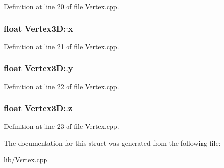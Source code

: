 Definition at line 20 of file Vertex.\+cpp.

\subsubsection[{\texorpdfstring{x}{x}}]{\setlength{\rightskip}{0pt plus 5cm}float Vertex3\+D\+::x}\hypertarget{struct_vertex3_d_a31874fac8de9ea8aa004f7d62c3b0a82}{}\label{struct_vertex3_d_a31874fac8de9ea8aa004f7d62c3b0a82}


Definition at line 21 of file Vertex.\+cpp.

\subsubsection[{\texorpdfstring{y}{y}}]{\setlength{\rightskip}{0pt plus 5cm}float Vertex3\+D\+::y}\hypertarget{struct_vertex3_d_acc2ceb770e03d6facf4c921de0eaf3d8}{}\label{struct_vertex3_d_acc2ceb770e03d6facf4c921de0eaf3d8}


Definition at line 22 of file Vertex.\+cpp.

\subsubsection[{\texorpdfstring{z}{z}}]{\setlength{\rightskip}{0pt plus 5cm}float Vertex3\+D\+::z}\hypertarget{struct_vertex3_d_af04a23eeeea792a53123e2d622395f8f}{}\label{struct_vertex3_d_af04a23eeeea792a53123e2d622395f8f}


Definition at line 23 of file Vertex.\+cpp.



The documentation for this struct was generated from the following file\+:\begin{DoxyCompactItemize}
\item 
lib/\hyperlink{_vertex_8cpp}{Vertex.\+cpp}\end{DoxyCompactItemize}
